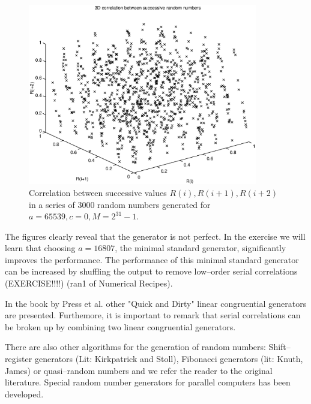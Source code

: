 \begin{figure}
\label{F_TRANDOM2_4}
\includegraphics[width=10cm]{./Figures/f_trandom2_4.eps}
\caption{Correlation between successive values 
$R(i),R(i+1), R(i+2)$ in a series of 3000 random numbers generated
for $a=65539, c=0, M=2^{31}-1$.}
\end{figure}

The figures clearly reveal that the generator is not perfect.
In the exercise we will learn that choosing $a=16807$, the minimal
standard generator, 
significantly improves the performance. The performance of 
this minimal standard generator can be increased by shuffling
the output to remove low--order serial correlations (EXERCISE!!!!)
({\sf ran1} of Numerical Recipes).

In the book by Press et al. other "Quick and Dirty" linear 
congruential generators
are presented. Furthemore, it is important to remark 
that serial correlations can be broken up by 
combining two linear congruential generators.

There are also other algorithms for the generation of random 
numbers: Shift--register generators (Lit: Kirkpatrick and Stoll), 
Fibonacci generators (lit: Knuth, James) or quasi--random numbers 
and we refer the reader to the original literature. Special random
number generators for parallel computers has been developed.

